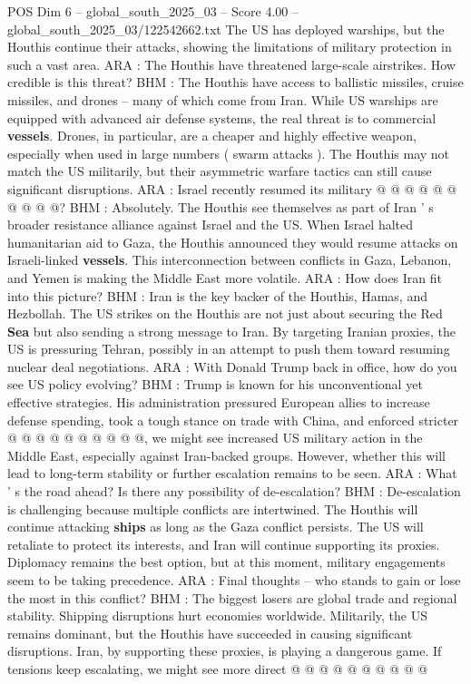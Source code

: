 \begin{textsample}{POS Dim 6 – global\_south\_2025\_03 – Score 4.00 – global\_south\_2025\_03/122542662.txt}
The US has deployed warships, but the Houthis continue their attacks, showing the limitations of military protection in such a vast area.
ARA : The Houthis have threatened large-scale airstrikes.
How credible is this threat?
BHM : The Houthis have access to ballistic missiles, cruise missiles, and drones -- many of which come from Iran.
While US warships are equipped with advanced air defense systems, the real threat is to commercial \textbf{vessels}.
Drones, in particular, are a cheaper and highly effective weapon, especially when used in large numbers ( swarm attacks ).
The Houthis may not match the US militarily, but their asymmetric warfare tactics can still cause significant disruptions.
ARA : Israel recently resumed its military @ @ @ @ @ @ @ @ @ @?
BHM : Absolutely.
The Houthis see themselves as part of Iran ' s broader resistance alliance against Israel and the US.
When Israel halted humanitarian aid to Gaza, the Houthis announced they would resume attacks on Israeli-linked \textbf{vessels}.
This interconnection between conflicts in Gaza, Lebanon, and Yemen is making the Middle East more volatile.
ARA : How does Iran fit into this picture?
BHM : Iran is the key backer of the Houthis, Hamas, and Hezbollah.
The US strikes on the Houthis are not just about securing the Red \textbf{Sea} but also sending a strong message to Iran.
By targeting Iranian proxies, the US is pressuring Tehran, possibly in an attempt to push them toward resuming nuclear deal negotiations.
ARA : With Donald Trump back in office, how do you see US policy evolving?
BHM : Trump is known for his unconventional yet effective strategies.
His administration pressured European allies to increase defense spending, took a tough stance on trade with China, and enforced stricter @ @ @ @ @ @ @ @ @ @, we might see increased US military action in the Middle East, especially against Iran-backed groups.
However, whether this will lead to long-term stability or further escalation remains to be seen.
ARA : What ' s the road ahead?
Is there any possibility of de-escalation?
BHM : De-escalation is challenging because multiple conflicts are intertwined.
The Houthis will continue attacking \textbf{ships} as long as the Gaza conflict persists.
The US will retaliate to protect its interests, and Iran will continue supporting its proxies.
Diplomacy remains the best option, but at this moment, military engagements seem to be taking precedence.
ARA : Final thoughts -- who stands to gain or lose the most in this conflict?
BHM : The biggest losers are global trade and regional stability.
Shipping disruptions hurt economies worldwide.
Militarily, the US remains dominant, but the Houthis have succeeded in causing significant disruptions.
Iran, by supporting these proxies, is playing a dangerous game.
If tensions keep escalating, we might see more direct @ @ @ @ @ @ @ @ @ @

\end{textsample}
